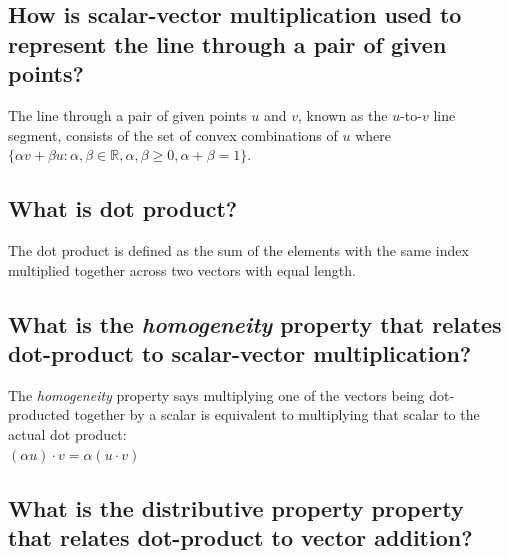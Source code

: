 \documentclass[
  letterpaper,
  DIV=11,
  numbers=noendperiod]{scrartcl}
\begin{document}
\hypertarget{how-is-scalar-vector-multiplication-used-to-represent-the-line-through-a-pair-of-given-points}{%
\subsection{How is scalar-vector multiplication used to represent the
line through a pair of given
points?}\label{how-is-scalar-vector-multiplication-used-to-represent-the-line-through-a-pair-of-given-points}}

The line through a pair of given points \(u\) and \(v\), known as the
\(u\)-to-\(v\) line segment, consists of the set of convex combinations
of \(u\) where
\(\{\alpha v + \beta u : \alpha, \beta \in \mathbb{R}, \alpha, \beta \geq 0, \alpha + \beta = 1\}\).

\hypertarget{what-is-dot-product}{%
\subsection{What is dot product?}\label{what-is-dot-product}}

The dot product is defined as the sum of the elements with the same
index multiplied together across two vectors with equal length.

\hypertarget{what-is-the-homogeneity-property-that-relates-dot-product-to-scalar-vector-multiplication}{%
\subsection{\texorpdfstring{What is the \emph{homogeneity} property that
relates dot-product to scalar-vector
multiplication?}{What is the homogeneity property that relates dot-product to scalar-vector multiplication?}}\label{what-is-the-homogeneity-property-that-relates-dot-product-to-scalar-vector-multiplication}}

The \emph{homogeneity} property says multiplying one of the vectors
being dot-producted together by a scalar is equivalent to multiplying
that scalar to the actual dot product:\\
\((\alpha u) \cdot v = \alpha (u \cdot v)\)

\hypertarget{what-is-the-distributive-property-property-that-relates-dot-product-to-vector-addition}{%
\subsection{What is the distributive property property that relates
dot-product to vector
addition?}\label{what-is-the-distributive-property-property-that-relates-dot-product-to-vector-addition}}
\end{document}
